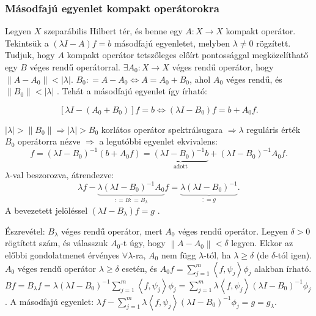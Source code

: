 \documentclass[12pt,a4paper]{scrartcl}
\begin{document}
\hypertarget{masodfaju-egyenlet-kompakt-operatorokra}{%
\subsubsection{Másodfajú egyenlet kompakt
operátorokra}\label{masodfaju-egyenlet-kompakt-operatorokra}}

Legyen \(X\) szeparábilis Hilbert tér, és benne egy
\(\left. A:X\rightarrow X \right.\) kompakt operátor. Tekintsük a
\(\left( {\lambda I - A} \right)f = b\) másodfajú egyenletet, melyben
\(\lambda \neq 0\) rögzített. Tudjuk, hogy \(A\) kompakt operátor
tetszőleges előírt pontossággal megközelíthatő egy \(B\) véges rendű
operátorral. \(\left. \exists A_{0}:X\rightarrow X \right.\) véges rendű
operátor, hogy
\(\left\| {A - A_{0}} \right\| < \left| \lambda \right|\).
\(\left. B_{0}: = A - A_{0}\Leftrightarrow A = A_{0} + B_{0} \right.\),
ahol \(A_{0}\) véges rendű, és
\(\left\| B_{0} \right\| < \left| \lambda \right|\) . Tehát a másodfajú
egyenlet így írható:

\[\left[ {\lambda I - \left( {{A_0} + {B_0}} \right)} \right]f = b \Leftrightarrow \left( {\lambda I - {B_0}} \right)f = b + {A_0}f.\]

\(\left. \left| \lambda \right| > \left\| B_{0} \right\|\Rightarrow\left| \lambda \right| > B_{0} \right.\)
korlátos operátor spektrálsugara \(\left. \Rightarrow\lambda \right.\)
reguláris érték \(B_{0}\) operátorra nézve \(\Rightarrow\) a legutóbbi
egyenlet ekvivalens:
\[f = {\left( {\lambda I - {B_0}} \right)^{ - 1}}\left( {b + {A_0}f} \right) = \underbrace {{{\left( {\lambda I - {B_0}} \right)}^{ - 1}}b}_{{\text{adott}}} + {\left( {\lambda I - {B_0}} \right)^{ - 1}}{A_0}f.\]
\(\lambda\)-val beszorozva, átrendezve:
\[\lambda f - \underbrace {\lambda {{\left( {\lambda I - {B_0}} \right)}^{ - 1}}{A_0}}_{: = B: = {B_\lambda }}f = \underbrace {\lambda {{\left( {\lambda I - {B_0}} \right)}^{ - 1}}}_{: = g}.\]
A bevezetett jelöléssel
\(\left( {\lambda I - B_{\lambda}} \right)f = g\) .

Észrevétel: \(B_{\lambda}\) véges rendű operátor, mert \(A_{0}\) véges
rendű operátor. Legyen \(\delta > 0\) rögtített szám, és válasszuk
\(A_{0}\)-t úgy, hogy \(\left\| {A - A_{0}} \right\| < \delta\) legyen.
Ekkor az előbbi gondolatmenet érvényes \(\forall\lambda\)-ra, \(A_{0}\)
nem függ \(\lambda\)-tól, ha \(\lambda \geq \delta\) (de \(\delta\)-tól
igen). \(A_{0}\) véges rendű operátor \(\lambda \geq \delta\) esetén, és
\(A_{0}f = {\sum\limits_{j = 1}^{m}{\left\langle {f,\psi_{j}} \right\rangle\phi_{j}}}\)
alakban írható.
\(Bf = B_{\lambda}f = \lambda\left( {\lambda I - B_{0}} \right)^{- 1}{\sum\limits_{j = 1}^{m}{\left\langle {f,\psi_{j}} \right\rangle\phi_{j}}} = {\sum\limits_{j = 1}^{m}{\lambda\left\langle {f,\psi_{j}} \right\rangle\left( {\lambda I - B_{0}} \right)^{- 1}\phi_{j}}}\).
A másodfajú egyenlet:
\(\lambda f - {\sum\limits_{j = 1}^{m}{\lambda\left\langle {f,\psi_{j}} \right\rangle\left( {\lambda I - B_{0}} \right)^{- 1}\phi_{j}}} = g = g_{\lambda}\).
\end{document}
